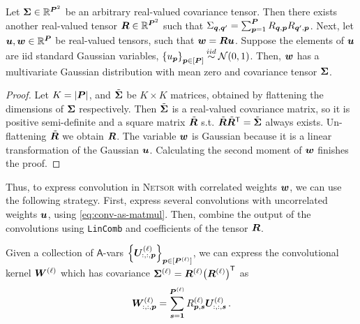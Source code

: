 \documentclass[accepted]{uai2021} %
\newcommand{\Netsor}{\textsc{Netsor}\xspace}
\newcommand{\Ava}{\mathsf{A}}
\newcommand{\LinComb}{\texttt{LinComb}\xspace}
\newcommand{\layerU}[1]{\vU^{(#1)}}
\newcommand{\layerW}[1]{\mW^{(#1)}}
\newcommand{\patchsizebase}{\vP}
\newcommand{\patchsize}[1]{{\patchsizebase^{\bra{#1}}}}
\newcommand{\priorWcov}[1]{\boldsymbol{\Sigma}^{(#1)}}
\newcommand{\patch}{\vp}               %
\newcommand{\nextpatch}{\vq}
\newcommand{\0}{\boldsymbol{0}}
\newcommand{\1}{\boldsymbol{1}}
\begin{document}
\begin{lemma}
  Let $\mSigma \in \sR^{\patchsizebase^{2}}$ be an arbitrary real-valued covariance tensor.
  Then there exists another real-valued tensor $\mR \in \sR^{\patchsizebase^{2}}$ such that $\Sigma_{\nextpatch,\nextpatch'} = \sum_{\patch=1}^{\patchsizebase}R_{\nextpatch,\patch} R_{\nextpatch',\patch}$.
  Next, let $\vu,\vw \in \sR^{\patchsizebase}$ be real-valued tensors, such that ${\bm{w}} = {\bm{R}} {\bm{u}}$. Suppose the elements of ${\bm{u}}$ are \ac{iid} standard Gaussian variables, $\cb{u_\patch}_{\patch \in \countto{\patchsizebase}} \simiid \Normal{0, 1}$. Then, ${\bm{w}}$ has a multivariate Gaussian distribution with mean zero and covariance tensor ${\boldsymbol\Sigma}$.
  \label{lemma:R}
\end{lemma}
\begin{proof}
  Let $K = \abs{\patchsizebase}$, and $\tilde{{\bm{\Sigma}}}$ be $K \times K$ matrices, obtained by flattening the dimensions of ${\bm{\Sigma}}$ respectively.
  Then $\tilde{{\bm{\Sigma}}}$ is a real-valued covariance matrix, so it is positive semi-definite and
  a square matrix $\tilde{{\bm{R}}}$ s.t. $\tilde{{\bm{R}}}{\tilde{{\bm{R}}}}^{\mathsf{T}} = \tilde{{\bm{\Sigma}}}$ always exists. Un-flattening $\tilde{{\bm{R}}}$ we obtain ${\bm{R}}$. The variable ${\bm{w}}$ is Gaussian because it is
  a linear transformation of the Gaussian ${\bm{u}}$. Calculating the second moment of ${\bm{w}}$ finishes the proof.
\end{proof}
Thus, to express convolution in \Netsor with correlated weights ${\bm{w}}$, we can use the
following strategy. First, express several convolutions with uncorrelated
weights ${\bm{u}}$, using \cref{eq:conv-as-matmul}. Then, combine the output of the convolutions using \LinComb and coefficients of
the tensor ${\bm{R}}$.

Given a collection of $\Ava$-vars
$\cb{\layerU{\ell}_{:,:,\patch}}_{\patch \in \countto{\patchsize{\ell}}}$, we
can express the convolutional kernel $\layerW{\ell}$ which has covariance
$\priorWcov{\ell} = \mR\ssup{\ell} \bra{\mR\ssup{\ell}}^{\tp}$ as
\begin{equation}
  \layerW{\ell}_{:,:,\patch} = \sum_{\vs=\1}^{\patchsize{\ell}}
  R\ssup{\ell}_{\patch,\vs}\layerU{\ell}_{:,:,\vs}\,.
\end{equation}
\end{document}
